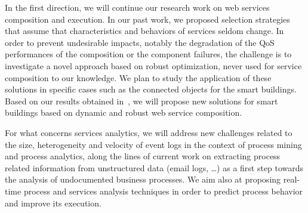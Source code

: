 In the first direction, we will continue our research work on web services composition and execution. In our past work, we proposed selection strategies that assume that characteristics and behaviors of services seldom change. In order to prevent undesirable impacts, notably the degradation of the QoS performances of the composition or the component failures, the challenge is to investigate a novel approach based on robust optimization, never used for service composition to our knowledge. We plan  to study the application of these solutions in specific cases such as the connected objects for the smart buildings. Based on our results obtained in~\cite{AngaritaArocha2016Modeling-1159056}, we will propose new solutions for smart buildings based on dynamic and robust web service composition.

For what concerns services analytics, we will address new challenges related to the size, heterogeneity and velocity of event logs in the context of   process mining and process analytics, along the lines of current work on extracting process related information from unstructured data (email logs, …) as a first step towards the analysis of undocumented business processes. We aim also at proposing real-time process and services analysis techniques in order to predict process behavior and improve its execution.


